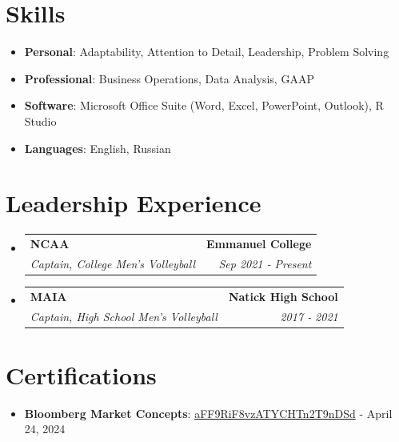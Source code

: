 \documentclass[letterpaper,]{article}
\makeatletter
\newcommand{\resumeItem}[2]{
  \item\small{
    \textbf{#1}{: #2 \vspace{-2pt}}
  }
}
\newcommand{\resumeSubheading}[4]{
  \vspace{-1pt}\item
    \begin{tabular*}{0.97\textwidth}[t]{l@{\extracolsep{\fill}}r}
      \textbf{#1} & #2 \\
      \textit{\small#3} & \textit{\small #4} \\
    \end{tabular*}
    \vspace{-5pt}
}
\newcommand{\resumeSubItem}[2]{\resumeItem{#1}{#2}\vspace{-4pt}}
\newcommand{\resumeSubHeadingListStart}{\begin{itemize}[leftmargin=*]}
\newcommand{\resumeSubHeadingListEnd}{\end{itemize}}
\makeatother
\begin{document}
\section{Skills}
  \resumeSubHeadingListStart
    
      \resumeSubItem{Personal}
        {Adaptability, Attention to Detail, Leadership, Problem Solving}
    
      \resumeSubItem{Professional}
        {Business Operations, Data Analysis, GAAP}

      \resumeSubItem{Software}
        {Microsoft Office Suite (Word, Excel, PowerPoint, Outlook), R Studio}
    
      \resumeSubItem{Languages}
        {English, Russian}

  \resumeSubHeadingListEnd
  
\section{Leadership Experience}
  \resumeSubHeadingListStart



    \resumeSubheading
      {NCAA}{\textbf {Emmanuel College}}
      {Captain, College Men's Volleyball}{Sep 2021 ‑ Present}

    \resumeSubheading
      {MAIA}{\textbf {Natick High School}}
      {Captain, High School Men's Volleyball}{2017 ‑ 2021}
    
  \resumeSubHeadingListEnd

\section{Certifications}

\resumeSubHeadingListStart
  \resumeSubItem{Bloomberg Market Concepts}
    {\href{https://portal.bloombergforeducation.com/certificates/aFF9RiF8vzATYCHTn2T9nDSd?fbclid=IwZXh0bgNhZW0CMTAAAR3-ujvQXxlrKKokvqcgeqzs4V5ppb-BhxnKoYus3PhcME4UJuSOAG2uvWk_aem_AZUypaVosUCKcX8Ps1ObZDUmYhYC6dA8jnRW6RfXXnHdNkYlZC0t_Etc4ewy5XklgO_EDGN7VuiNMd-jd7LSAhzj}{aFF9RiF8vzATYCHTn2T9nDSd}}- {{April 24, 2024}}
\resumeSubHeadingListEnd
\end{document}
